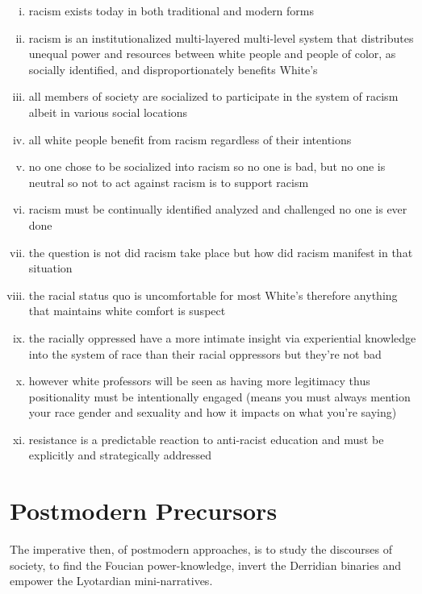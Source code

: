 \documentclass[10pt,titlepage]{article}
\begin{document}
\begin{enumerate}[i)]
\item  racism exists today in both traditional and modern forms
\item  racism is an institutionalized multi-layered multi-level system that distributes unequal power and resources between white people and people of color, as socially identified, and disproportionately benefits White's
\item  all members of society are socialized to participate in the system of racism albeit in various social locations
\item all white people benefit from racism regardless of their intentions
\item no one chose to be socialized into racism so no one is bad, but no one is neutral so not to act against racism is to support racism
\item racism must be continually identified analyzed and challenged no one is ever done
\item the question is not did racism take place but how did racism manifest in that situation
\item the racial status quo is uncomfortable for most White's therefore anything that maintains white comfort is suspect
\item the racially oppressed have a more intimate insight via experiential knowledge into the system of race than their racial oppressors but they're not bad
  \item however white professors will be seen as having more legitimacy thus positionality must be intentionally engaged (means you must always mention your race gender and sexuality and how it impacts on what you're saying)
\item resistance is a predictable reaction to anti-racist education and must be explicitly and strategically addressed
\end{enumerate}

\section{Postmodern Precursors}

The imperative then, of postmodern approaches, is to study the discourses of society, to find the Foucian power-knowledge, invert the Derridian binaries and empower the Lyotardian mini-narratives.
\end{document}
